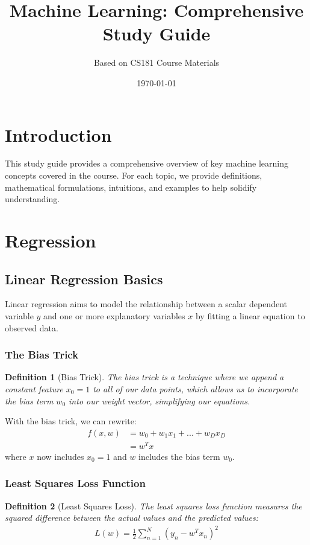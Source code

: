 \documentclass{article}
\title{Machine Learning: Comprehensive Study Guide}
\author{Based on CS181 Course Materials}
\date{\today}
\newtheorem{definition}{Definition}
\begin{document}
\maketitle
\tableofcontents
\newpage

\section{Introduction}
This study guide provides a comprehensive overview of key machine learning concepts covered in the course. For each topic, we provide definitions, mathematical formulations, intuitions, and examples to help solidify understanding.

\section{Regression}

\subsection{Linear Regression Basics}
Linear regression aims to model the relationship between a scalar dependent variable $y$ and one or more explanatory variables $x$ by fitting a linear equation to observed data.

\subsubsection{The Bias Trick}
\begin{definition}[Bias Trick]
The bias trick is a technique where we append a constant feature $x_0 = 1$ to all of our data points, which allows us to incorporate the bias term $w_0$ into our weight vector, simplifying our equations.
\end{definition}

With the bias trick, we can rewrite:
\begin{align}
f(x, w) &= w_0 + w_1x_1 + ... + w_Dx_D\\
&= w^Tx
\end{align}
where $x$ now includes $x_0 = 1$ and $w$ includes the bias term $w_0$.

\subsubsection{Least Squares Loss Function}
\begin{definition}[Least Squares Loss]
The least squares loss function measures the squared difference between the actual values and the predicted values:
\begin{align}
L(w) = \frac{1}{2}\sum_{n=1}^{N}(y_n - w^Tx_n)^2
\end{align}
\end{definition}
\end{document}

